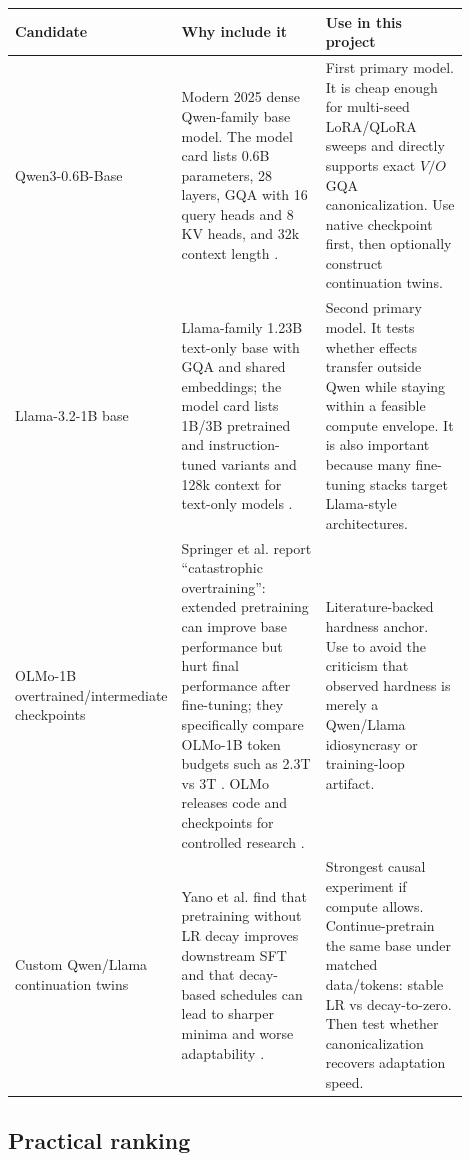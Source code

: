 \documentclass[11pt]{article}
\begin{document}
\begin{longtable}{>{\raggedright\arraybackslash}p{0.20\linewidth} >{\raggedright\arraybackslash}p{0.36\linewidth} >{\raggedright\arraybackslash}p{0.34\linewidth}}
\toprule
Candidate & Why include it & Use in this project \\
\midrule
Qwen3-0.6B-Base & Modern 2025 dense Qwen-family base model. The model card lists 0.6B parameters, 28 layers, GQA with 16 query heads and 8 KV heads, and 32k context length \cite{qwen3hf06b}. & First primary model. It is cheap enough for multi-seed LoRA/QLoRA sweeps and directly supports exact $V/O$ GQA canonicalization. Use native checkpoint first, then optionally construct continuation twins. \\
\addlinespace
Llama-3.2-1B base & Llama-family 1.23B text-only base with GQA and shared embeddings; the model card lists 1B/3B pretrained and instruction-tuned variants and 128k context for text-only models \cite{llama32hf1b}. & Second primary model. It tests whether effects transfer outside Qwen while staying within a feasible compute envelope. It is also important because many fine-tuning stacks target Llama-style architectures. \\
\addlinespace
OLMo-1B overtrained/intermediate checkpoints & Springer et al. report ``catastrophic overtraining'': extended pretraining can improve base performance but hurt final performance after fine-tuning; they specifically compare OLMo-1B token budgets such as 2.3T vs 3T \cite{springer2025overtrained}. OLMo releases code and checkpoints for controlled research \cite{groeneveld2024olmo}. & Literature-backed hardness anchor. Use to avoid the criticism that observed hardness is merely a Qwen/Llama idiosyncrasy or training-loop artifact. \\
\addlinespace
Custom Qwen/Llama continuation twins & Yano et al. find that pretraining without LR decay improves downstream SFT and that decay-based schedules can lead to sharper minima and worse adaptability \cite{yano2026wso}. & Strongest causal experiment if compute allows. Continue-pretrain the same base under matched data/tokens: stable LR vs decay-to-zero. Then test whether canonicalization recovers adaptation speed. \\
\bottomrule
\end{longtable}

\subsection{Practical ranking}
\end{document}

